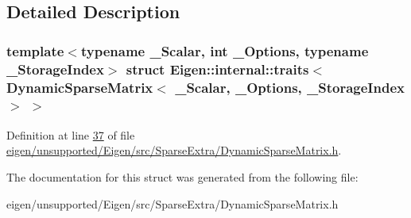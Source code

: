 \subsection{Detailed Description}
\subsubsection*{template$<$typename \+\_\+\+Scalar, int \+\_\+\+Options, typename \+\_\+\+Storage\+Index$>$\newline
struct Eigen\+::internal\+::traits$<$ Dynamic\+Sparse\+Matrix$<$ \+\_\+\+Scalar, \+\_\+\+Options, \+\_\+\+Storage\+Index $>$ $>$}



Definition at line \hyperlink{eigen_2unsupported_2_eigen_2src_2_sparse_extra_2_dynamic_sparse_matrix_8h_source_l00037}{37} of file \hyperlink{eigen_2unsupported_2_eigen_2src_2_sparse_extra_2_dynamic_sparse_matrix_8h_source}{eigen/unsupported/\+Eigen/src/\+Sparse\+Extra/\+Dynamic\+Sparse\+Matrix.\+h}.



The documentation for this struct was generated from the following file\+:\begin{DoxyCompactItemize}
\item 
eigen/unsupported/\+Eigen/src/\+Sparse\+Extra/\+Dynamic\+Sparse\+Matrix.\+h\end{DoxyCompactItemize}
